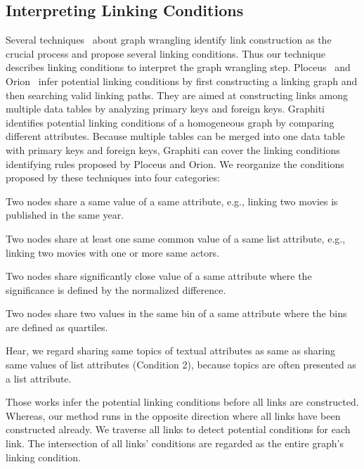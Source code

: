 \subsection{Interpreting Linking Conditions}
Several techniques~\cite{DBLP:journals/ivs/LiuNS14, DBLP:journals/ivs/HeerP14, DBLP:journals/tvcg/SrinivasanPEB18} about graph wrangling identify link construction as the crucial process and propose several linking conditions.
Thus our technique describes linking conditions to interpret the graph wrangling step.
Ploceus~\cite{DBLP:journals/ivs/LiuNS14} and Orion~\cite{DBLP:journals/ivs/HeerP14} infer potential linking conditions by first constructing a linking graph and then searching valid linking paths. They are aimed at constructing links among multiple data tables by analyzing primary keys and foreign keys.
Graphiti~\cite{DBLP:journals/tvcg/SrinivasanPEB18} identifies potential linking conditions of a homogeneous graph by comparing different attributes.
Because multiple tables can be merged into one data table with primary keys and foreign keys, Graphiti can cover the linking conditions identifying rules proposed by Ploceus and Orion. %
We reorganize the conditions proposed by these techniques into four categories:
\begin{compactenum}[\textbf{C}1]
    \item Two nodes share a same value of a same attribute, e.g., linking two movies is published in the same year.
    \item Two nodes share at least one same common value of a same list attribute, e.g., linking two movies with one or more same actors.
    \item Two nodes share significantly close value of a same attribute where the significance is defined by the normalized difference.
    \item Two nodes share two values in the same bin of a same attribute where the bins are defined as quartiles.
\end{compactenum}
Hear, we regard sharing same topics of textual attributes as same as sharing same values of list attributes (Condition 2), because topics are often presented as a list attribute.

Those works infer the potential linking conditions before all links are constructed. 
Whereas, our method runs in the opposite direction where all links have been constructed already.
We traverse all links to detect potential conditions for each link.
The intersection of all links' conditions are regarded as the entire graph's linking condition.

